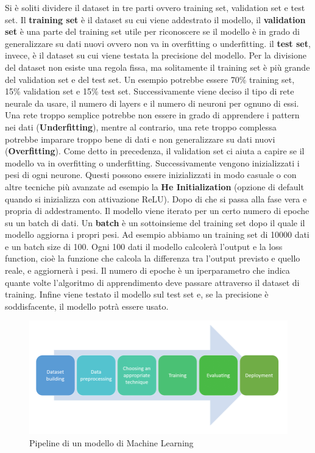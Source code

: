 \documentclass[12pt,a4paper,openright,twoside]{book}
\begin{document}
\noindent Si è soliti dividere il dataset in tre parti ovvero training set, validation set e test set.
Il \textbf{training set} è il dataset su cui viene addestrato
il modello, il \textbf{validation set} è una parte del training set
utile per riconoscere se il modello è in grado di generalizzare
su dati nuovi ovvero non va in overfitting o underfitting.
il \textbf{test set}, invece, è il dataset
su cui viene testata la precisione del modello.
Per la divisione del dataset non esiste una regola fissa,
ma solitamente il training set è più grande del validation set
e del test set. Un esempio potrebbe essere 70\% training set, 15\% validation set
e 15\% test set.
Successivamente viene deciso il tipo di rete 
neurale da usare, il numero di layers e il numero
di neuroni per ognuno di essi. Una rete troppo semplice
potrebbe non essere in grado di apprendere i pattern
nei dati (\textbf{Underfitting}), mentre al contrario,
una rete troppo complessa potrebbe imparare
troppo bene di dati e non generalizzare su dati nuovi
(\textbf{Overfitting}). Come detto in precedenza, il validation
set ci aiuta a capire se il modello va in overfitting o underfitting.
Successivamente vengono inizializzati i pesi di ogni neurone.
Questi possono essere inizializzati in modo casuale
o con altre tecniche più avanzate ad esempio
la \textbf{He Initialization} \cite{he2015delving}
(opzione di default quando si inizializza 
con attivazione ReLU).
Dopo di che si passa alla fase vera e propria di addestramento.
Il modello viene iterato per un certo numero di epoche su un batch di dati.
Un \textbf{batch} è un sottoinsieme del training set dopo il quale il modello
aggiorna i propri pesi. Ad esempio abbiamo un training set di 10000 dati
e un batch size di 100. Ogni 100 dati il modello calcolerà
l'output e la loss function, cioè la funzione che calcola
la differenza tra l'output previsto e quello reale,
e aggiornerà i pesi.
Il numero di epoche è un iperparametro che indica quante volte
l'algoritmo di apprendimento deve passare attraverso il dataset di training\cite{brownlee2018difference}.
Infine viene testato il modello sul test set e, se la precisione
è soddisfacente, il modello potrà essere usato.
\begin{figure}[H]
    \centering
    \includegraphics[width=.8\linewidth]{figures/Machine-learning-pipeline.png}
    \caption{Pipeline di un modello di Machine Learning \cite{phdthesishamza}}
    \label{fig:ML pipeline}
\end{figure}
\end{document}
